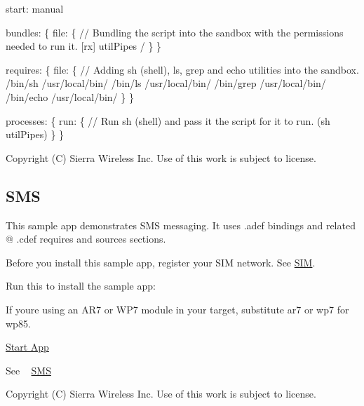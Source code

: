 \begin{DoxyCode}
start: manual

bundles:
\{
    file:
    \{
        \textcolor{comment}{// Bundling the script into the sandbox with the permissions needed to run it.}
        [rx] utilPipes    /
    \}
\}

requires:
\{
    file:
    \{
        \textcolor{comment}{// Adding sh (shell), ls, grep and echo utilities into the sandbox.}
        /bin/sh     /usr/local/bin/
        /bin/ls     /usr/local/bin/
        /bin/grep   /usr/local/bin/
        /bin/echo   /usr/local/bin/
    \}
\}

processes:
\{
    run:
    \{
        \textcolor{comment}{// Run sh (shell) and pass it the script for it to run.}
        (sh utilPipes)
    \}
\}
\end{DoxyCode}






Copyright (C) Sierra Wireless Inc. Use of this work is subject to license. \hypertarget{sampleApps_sms}{}\subsection{S\+M\+S}\label{sampleApps_sms}
This sample app demonstrates S\+M\+S messaging. It uses {\ttfamily }.adef bindings and related @ .cdef requires and sources sections.

Before you install this sample app, register your S\+I\+M network. See \hyperlink{tools_target_cm_toolsTarget_cm_sim}{S\+I\+M}.

Run this to install the sample app\+: 


If you\textquotesingle{}re using an A\+R7 or W\+P7 module in your target, substitute {\ttfamily ar7} or {\ttfamily wp7} for {\ttfamily wp85}.

\hyperlink{sample_apps_sampleApps_startApp}{Start App}

See ~\newline
 \hyperlink{c_sms}{S\+M\+S}





Copyright (C) Sierra Wireless Inc. Use of this work is subject to license. 